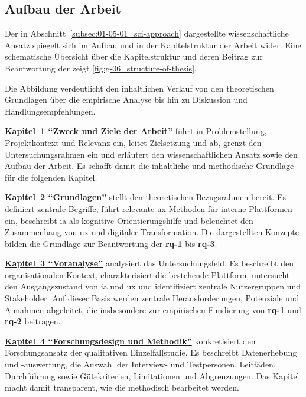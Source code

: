 \subsection{Aufbau der Arbeit}
\label{subsec:01-05-02_structure}

Der in Abschnitt~\ref{subsec:01-05-01_sci-approach} dargestellte wissenschaftliche Ansatz spiegelt sich im Aufbau und in der Kapitelstruktur der Arbeit wider. 
Eine schematische Übersicht über die Kapitelstruktur und deren Beitrag zur Beantwortung der  zeigt \autoref{fig:g-06_structure-of-thesis}.


Die Abbildung verdeutlicht den inhaltlichen Verlauf von den theoretischen Grundlagen über die empirische Analyse bis hin zu Diskussion und Handlungsempfehlungen.

\textbf{\hyperref[ch:01_purpose-and-objectives]{Kapitel~1 \enquote{Zweck und Ziele der Arbeit}}} führt in Problemstellung, Projektkontext und Relevanz ein, leitet Zielsetzung und  ab, grenzt den Untersuchungsrahmen ein und erläutert den wissenschaftlichen Ansatz sowie den Aufbau der Arbeit. Es schafft damit die inhaltliche und methodische Grundlage für die folgenden Kapitel.

\textbf{\hyperref[ch:02_theoretical-foundations]{Kapitel~2 \enquote{Grundlagen}}} stellt den theoretischen Bezugsrahmen bereit. Es definiert zentrale Begriffe, führt relevante \Gls{ux}-Methoden für interne Plattformen ein, beschreibt \Gls{ia} als kognitive Orientierungshilfe und beleuchtet den Zusammenhang von \Gls{ux} und digitaler Transformation. Die dargestellten Konzepte bilden die Grundlage zur Beantwortung der  \textbf{\Gls{rq}-1} bis \textbf{\Gls{rq}-3}.

\textbf{\hyperref[ch:03_pre-analysis]{Kapitel~3 \enquote{Voranalyse}}} analysiert das Untersuchungsfeld. Es beschreibt den organisationalen Kontext, charakterisiert die bestehende Plattform, untersucht den Ausgangszustand von \Gls{ia} und \Gls{ux} und identifiziert zentrale Nutzergruppen und Stakeholder. Auf dieser Basis werden zentrale Herausforderungen, Potenziale und Annahmen abgeleitet, die insbesondere zur empirischen Fundierung von \textbf{\Gls{rq}-1} und \textbf{\Gls{rq}-2} beitragen.

\textbf{\hyperref[ch:04_methodology]{Kapitel~4 \enquote{Forschungsdesign und Methodik}}} konkretisiert den Forschungsansatz der qualitativen Einzelfallstudie. Es beschreibt Datenerhebung und -auswertung, die Auswahl der Interview- und Testpersonen, Leitfäden, Durchführung sowie Gütekriterien, Limitationen und Abgrenzungen. Das Kapitel macht damit transparent, wie die  methodisch bearbeitet werden.

